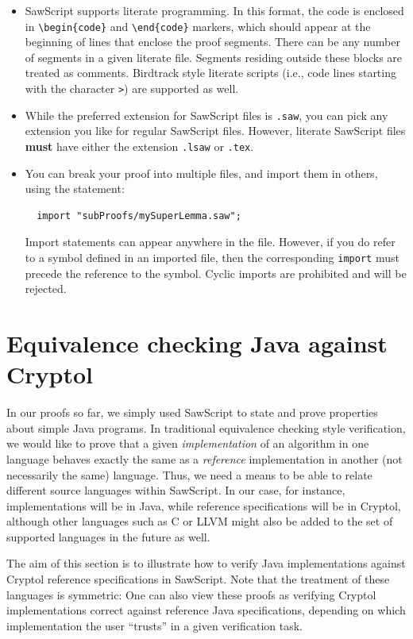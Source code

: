 \documentclass[12pt]{galois-whitepaper}
\newcommand{\sawScript}{{\sc SawScript}\xspace}
\begin{document}
\begin{itemize}
\item \sawScript supports literate programming. In this format, the code is enclosed in {\tt \textbackslash begin\{code\}}
and {\tt \textbackslash end\{code\}} markers, which should appear at the beginning of lines that enclose the proof segments. There can
be any number of segments in a given literate file. Segments residing outside these blocks
are treated as comments. Birdtrack style literate scripts (i.e., code lines starting with the character {\tt >})
are supported as well.
\item While the preferred extension for \sawScript files is {\tt .saw}, you can pick any extension you like for
regular \sawScript files.  However, literate \sawScript files {\bf must} have either the extension
{\tt .lsaw} or {\tt .tex}. 
\item You can break your proof into multiple files, and import them in others, using the statement:
\begin{Verbatim}
  import "subProofs/mySuperLemma.saw";
\end{Verbatim}
Import statements can appear anywhere in the file. However, if you do refer to a symbol defined in an imported file, then the corresponding
{\tt import} must precede the reference to the symbol. Cyclic imports are prohibited and will be rejected.
\end{itemize}

\section{Equivalence checking Java against Cryptol}
In our proofs so far, we simply used \sawScript to state and prove properties about simple Java programs.
In traditional equivalence checking style
verification, we would like to prove that a given {\em implementation} of an algorithm in one language behaves exactly the same as a {\em reference}
implementation in another (not necessarily the same) language. 
Thus, we need a means
to be able to relate different source languages within \sawScript. 
In our case, for instance, implementations will be in Java, while reference specifications will be in Cryptol, although
other languages such as C or LLVM might also be added to the set of supported languages in the future as well.

The aim of this section is to illustrate how to verify Java implementations against Cryptol reference specifications
in \sawScript. Note that the treatment of these languages is symmetric: One can also view these proofs as verifying Cryptol
implementations correct against reference Java specifications, depending on which implementation the user ``trusts'' in
a given verification task.
\end{document}
